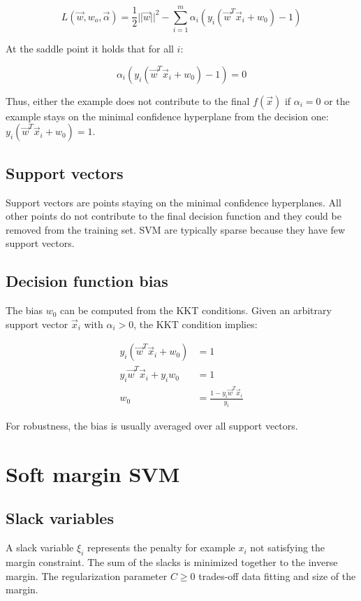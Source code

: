 	$$L(\vec{w}, w_o, \vec{\alpha}) = \frac{1}{2}||\vec{w}||^2-\sum\limits_{i=1}^m\alpha_i(y_i(\vec{w}^T\vec{x}_i+w_0)-1)$$

	At the saddle point it holds that for all $i$:

	$$\alpha_i(y_i(\vec{w}^T\vec{x}_i+w_0)-1) = 0$$

	Thus, either the example does not contribute to the final $f(\vec{x})$ if $\alpha_i=0$ or the example stays on the minimal confidence hyperplane from the decision one: $y_i(\vec{w}^T\vec{x}_i+w_0) = 1$.

	\subsection{Support vectors}
	Support vectors are points staying on the minimal confidence hyperplanes.
	All other points do not contribute to the final decision function and they could be removed from the training set.
	SVM are typically sparse because they have few support vectors.

	\subsection{Decision function bias}
	The bias $w_0$ can be computed from the KKT conditions.
	Given an arbitrary support vector $\vec{x}_i$ with $\alpha_i>0$, the KKT condition implies:

	\begin{align*}
		y_i(\vec{w}^T\vec{x}_i+w_0) &=1\\
		y_i\vec{w}^T\vec{x}_i+y_iw_0 &= 1\\
		w_0 &=\frac{1-y_i\vec{w}^T\vec{x}_i}{y_i}
	\end{align*}

	For robustness, the bias is usually averaged over all support vectors.

\section{Soft margin SVM}

	\subsection{Slack variables}
	A slack variable $\xi_i$ represents the penalty for example $x_i$ not satisfying the margin constraint.
	The sum of the slacks is minimized together to the inverse margin.
	The regularization parameter $C\ge 0$ trades-off data fitting and size of the margin.

